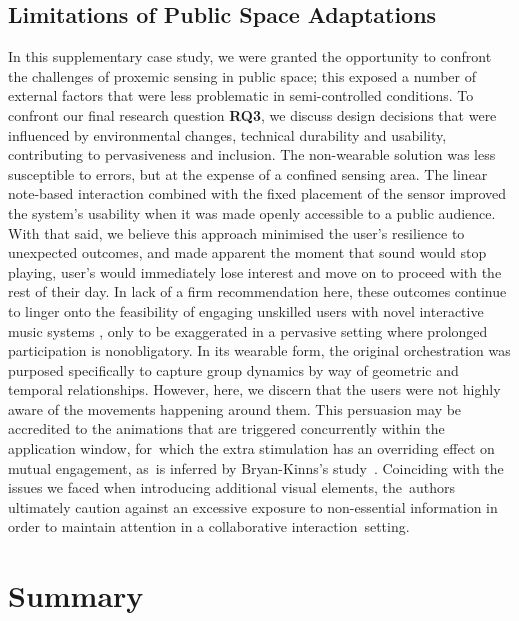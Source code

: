 \subsection*{Limitations of Public Space Adaptations}

In this supplementary case study, we were granted the opportunity to confront the challenges of proxemic sensing in public space; this exposed a number of external factors that were less problematic in semi-controlled conditions. To confront our final research question \textbf{RQ3}, we discuss design decisions that were influenced by environmental changes, technical durability and usability, contributing to pervasiveness and inclusion. The non-wearable solution was less susceptible to errors, but at the expense of a confined sensing area. The linear note-based interaction combined with the fixed placement of the sensor improved the system's usability when it was made openly accessible to a public audience. With that said, we believe this approach minimised the user's resilience to unexpected outcomes, and made apparent the moment that sound would stop playing, user's would immediately lose interest and move on to proceed with the rest of their day. In lack of a firm recommendation here, these outcomes continue to linger onto the feasibility of engaging unskilled users with novel interactive music systems \citep{holland_musical_2019}, only to be exaggerated in a pervasive setting where prolonged participation is nonobligatory. In its wearable form, the original orchestration was purposed specifically to capture group dynamics by way of geometric and temporal relationships. However, here, we discern that the users were not highly aware of the movements happening around them. This persuasion may be accredited to the animations that are triggered concurrently within the application window, for~which the extra stimulation has an overriding effect on mutual engagement, as~is inferred by  Bryan-Kinns's %
study~\cite{bryan-kinns_mutual_2013}. Coinciding with the issues we faced when introducing additional visual elements, the~authors ultimately caution against an excessive exposure to non-essential information in order to maintain attention in a collaborative interaction~setting.


\section{Summary}


